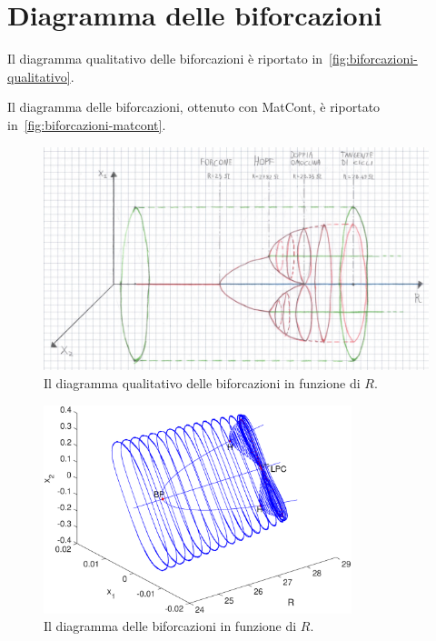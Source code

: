 \section{Diagramma delle biforcazioni}

Il diagramma qualitativo delle biforcazioni è riportato in~\autoref{fig:biforcazioni-qualitativo}.

Il diagramma delle biforcazioni, ottenuto con MatCont, è riportato in~\autoref{fig:biforcazioni-matcont}.

\begin{figure}
\centering
\includegraphics[width=\textwidth]{images/diagramma_qualitativo}
\caption{Il diagramma qualitativo delle biforcazioni in funzione di $R$.}
\label{fig:biforcazioni-qualitativo}
\end{figure}

\begin{figure}
\centering
\includegraphics[width=0.8\textwidth]{matcont/BiforcazioniCompleto}
\caption{Il diagramma delle biforcazioni in funzione di $R$.}
\label{fig:biforcazioni-matcont}
\end{figure}
